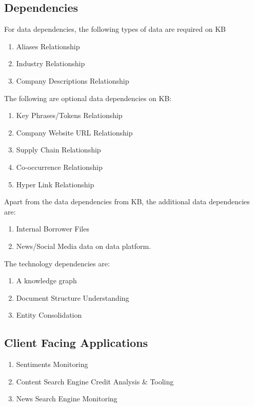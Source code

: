 \documentclass[]{article}
\begin{document}
\subsection{Dependencies}
For data dependencies, the following types of data are required on KB

\begin{enumerate}
    \item Aliases Relationship
    \item Industry Relationship
    \item Company Descriptions Relationship
\end{enumerate}

The following are optional data dependencies on KB:

\begin{enumerate}
    \item Key Phrases/Tokens Relationship
    \item Company Website URL Relationship
    \item Supply Chain Relationship
    \item Co-occurrence Relationship
    \item Hyper Link Relationship
\end{enumerate}

Apart from the data dependencies from KB, the additional data dependencies are:

\begin{enumerate}
    \item Internal Borrower Files
    \item News/Social Media data on data platform.
\end{enumerate}

The technology dependencies are:

\begin{enumerate}
    \item A knowledge graph
    \item Document Structure Understanding
    \item Entity Consolidation
\end{enumerate}

\subsection{Client Facing Applications}
\begin{enumerate}
    \item Sentiments \textrightarrow Monitoring
    \item Content Search Engine \textrightarrow Credit Analysis \& Tooling
    \item News Search Engine \textrightarrow Monitoring
\end{enumerate}
\end{document}
